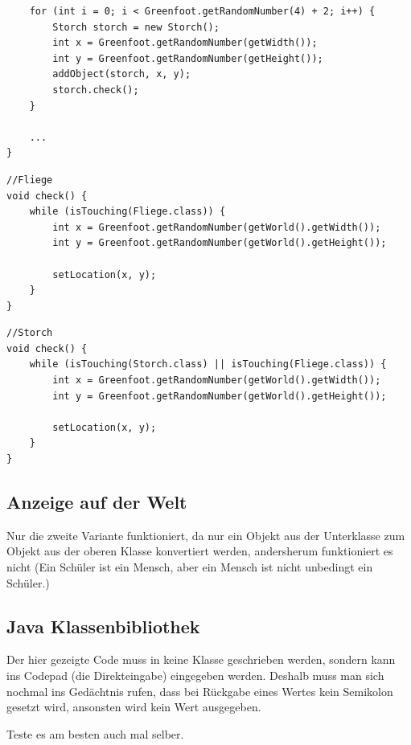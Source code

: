 \documentclass{scrartcl}   %
\begin{document}
\begin{itemize}
\begin{lstlisting}
    for (int i = 0; i < Greenfoot.getRandomNumber(4) + 2; i++) {
        Storch storch = new Storch();
        int x = Greenfoot.getRandomNumber(getWidth());
        int y = Greenfoot.getRandomNumber(getHeight());
        addObject(storch, x, y);
        storch.check();
    }
    
    ...
}
    \end{lstlisting}
    
    \newpage
    
    \begin{lstlisting}
//Fliege
void check() {
    while (isTouching(Fliege.class)) {
        int x = Greenfoot.getRandomNumber(getWorld().getWidth());
        int y = Greenfoot.getRandomNumber(getWorld().getHeight());
        
        setLocation(x, y);
    }
}
    \end{lstlisting}
    \begin{lstlisting}
//Storch
void check() {
    while (isTouching(Storch.class) || isTouching(Fliege.class)) {
        int x = Greenfoot.getRandomNumber(getWorld().getWidth());
        int y = Greenfoot.getRandomNumber(getWorld().getHeight());
        
        setLocation(x, y);
    }
}
    \end{lstlisting}
\end{itemize}

\subsection{Anzeige auf der Welt}

Nur die zweite Variante funktioniert, da nur ein Objekt aus der Unterklasse zum Objekt aus der oberen Klasse konvertiert werden, andersherum funktioniert es nicht (\glqq Ein Schüler ist ein Mensch, aber ein Mensch ist nicht unbedingt ein Schüler.\grqq)

\newpage

\subsection{Java Klassenbibliothek}

Der hier gezeigte Code muss in keine Klasse geschrieben werden, sondern kann ins Codepad (die Direkteingabe) eingegeben werden. Deshalb muss man sich nochmal ins Gedächtnis rufen, dass bei Rückgabe eines Wertes kein Semikolon gesetzt wird, ansonsten wird kein Wert ausgegeben.

Teste es am besten auch mal selber.
\end{document}
